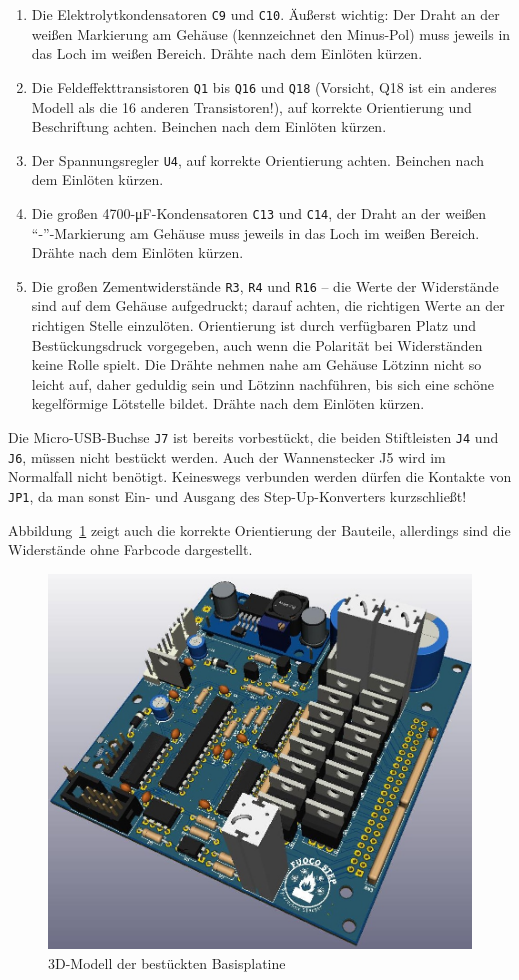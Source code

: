 \documentclass[paper=a4, open=any, numbers=noenddot]{scrbook}
\begin{document}
\begin{enumerate}
					\item
					      Die Elektrolytkondensatoren \texttt{C9} und \texttt{C10}. Äußerst wichtig: Der Draht an der weißen Markierung am Gehäuse (kennzeichnet den Minus-Pol) muss jeweils in das Loch im weißen Bereich. Drähte nach dem Einlöten kürzen.
					\item
					      Die Feldeffekttransistoren \texttt{Q1} bis \texttt{Q16} und \texttt{Q18} (Vorsicht, Q18 ist ein anderes Modell als die 16 anderen Transistoren!), auf korrekte Orientierung und Beschriftung achten. Beinchen nach dem Einlöten kürzen.
					\item
					      Der Spannungsregler \texttt{U4}, auf korrekte Orientierung achten. Beinchen nach dem Einlöten kürzen.
					\item
					      Die großen 4700-\si{\micro\farad}-Kondensatoren \texttt{C13} und \texttt{C14}, der Draht an der weißen \enquote{-}-Markierung am Gehäuse muss jeweils in das Loch im weißen Bereich. Drähte nach dem Einlöten kürzen.
					\item
					      Die großen Zementwiderstände \texttt{R3}, \texttt{R4} und \texttt{R16} -- die Werte der Widerstände sind auf dem Gehäuse aufgedruckt; darauf achten, die richtigen Werte an der richtigen Stelle einzulöten. Orientierung ist durch verfügbaren Platz und Bestückungsdruck vorgegeben, auch wenn die Polarität bei Widerständen keine Rolle spielt. Die Drähte nehmen nahe am Gehäuse Lötzinn nicht so leicht auf, daher geduldig sein und Lötzinn nachführen, bis sich eine schöne kegelförmige Lötstelle bildet. Drähte nach dem Einlöten kürzen.
				\end{enumerate}

				Die Micro-USB-Buchse \texttt{J7} ist bereits vorbestückt, die beiden Stiftleisten \texttt{J4} und \texttt{J6}, müssen nicht bestückt werden. Auch der Wannenstecker {J5} wird im Normalfall nicht benötigt. Keineswegs verbunden werden dürfen die Kontakte von \texttt{JP1}, da man sonst Ein- und Ausgang des Step-Up-Konverters kurzschließt!

				Abbildung~\ref{fig:base3d} zeigt auch die korrekte Orientierung der Bauteile, allerdings sind die Widerstände ohne Farbcode dargestellt.

				\begin{figure}[H]
					\centering\includegraphics[width=.7\textwidth]{Bilder/base3d}
					\caption{3D-Modell der bestückten Basisplatine}
					\label{fig:base3d}
				\end{figure}
\end{document}
